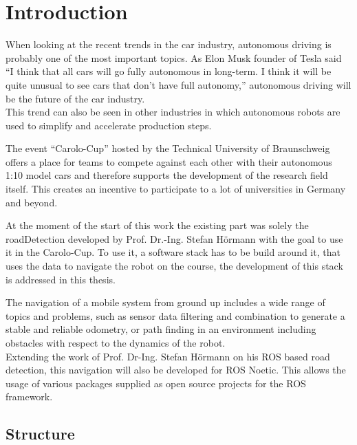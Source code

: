 \chapter{Introduction}
\label{introduction}

When looking at the recent trends in the car industry, autonomous driving is probably one of the most important topics. As Elon Musk founder of Tesla said ``I think that all cars will go fully autonomous in long-term. I think it will be quite unusual to see cars that don’t have full autonomy,'' autonomous driving will be the future of the car industry\cite{musk}.\\

This trend can also be seen in other industries  in which autonomous robots are used to simplify and accelerate production steps. 



The event ``Carolo-Cup'' hosted by the Technical University of Braunschweig offers a place for teams to compete against each other with their autonomous 1:10 model cars and therefore supports the development of the research field itself. This creates an incentive to participate to a lot of universities in Germany and beyond.\\

At the moment of the start of this work the existing part was solely the roadDetection developed by Prof. Dr.-Ing. Stefan Hörmann with the goal to use it in the Carolo-Cup. To use it, a software stack has to be build around it, that uses the data to navigate the robot on the course, the development of this stack is addressed in this thesis.


The navigation of a mobile system from ground up includes a wide range of topics and problems, such as sensor data filtering and combination to generate a stable and reliable odometry, or path finding in an environment including obstacles with respect to the dynamics of the robot.\\

Extending the work of Prof. Dr-Ing. Stefan Hörmann on his ROS based road detection, this navigation will also be developed for ROS Noetic. This allows the usage of various packages supplied as open source projects for the ROS framework.

\section{Structure}

